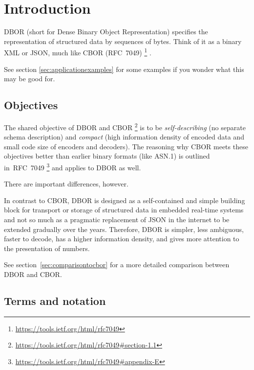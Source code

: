 
\section{Introduction}

DBOR (short for Dense Binary Object Representation) specifies the representation of structured data by
sequences of bytes. Think of it as a binary XML or JSON, much like CBOR (RFC~7049)%
\footnote{%
    \url{https://tools.ietf.org/html/rfc7049}
}%
.

\medskip
See section \ref{sec:applicationexamples} for some examples if you wonder what this may be good for.


\subsection{Objectives}

The shared objective of DBOR and CBOR%
\footnote{%
    \url{https://tools.ietf.org/html/rfc7049\#section-1.1}
}
is to be
\emph{self-describing} (no separate schema description) and
\emph{compact} (high information density of encoded data and small code size of encoders and decoders).
The reasoning why CBOR meets these objectives better than earlier binary formats (like ASN.1) is outlined in~RFC~7049%
\footnote{%
    \url{https://tools.ietf.org/html/rfc7049\#appendix-E}
}
and applies to DBOR as well.

\medskip
There are important differences, however.

In contrast to CBOR, DBOR is designed as a self-contained and simple building block for transport or storage
of structured data in embedded real-time systems and not so much as a pragmatic replacement of JSON in the internet
to be extended gradually over the years.
Therefore, DBOR is simpler, less ambiguous, faster to decode, has a higher information density, and gives more attention
to the presentation of numbers.

\medskip
See section~\ref{sec:comparisontocbor} for a more detailed comparison between DBOR and CBOR.


\subsection{Terms and notation}

